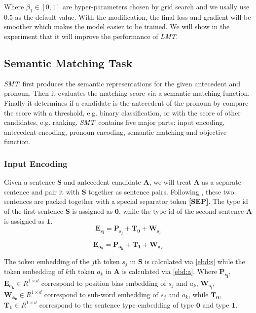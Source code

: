 \documentclass[11pt,a4paper]{article}
\newcommand{\lmt}{\textit{LMT}}
\newcommand{\smt}{\textit{SMT}}
\begin{document}
Where $\beta_1 \in [0,1]$ are hyper-parameters chosen by grid search and we usally use $0.5$ as the default value. With the modification, the final loss and gradient will be smoother which makes the model easier to be trained. We will show in the experiment that it will improve the performance of \lmt.

\subsection{Semantic Matching Task}
\label{sec:smt}






\smt~first produces the semantic representations for the given antecedent and pronoun. Then it evaluates the matching score via a semantic matching function. Finally it determines if a candidate is the antecedent of the pronoun by compare the score with a threshold, e.g. binary classification, or with the score of other candidates, e.g. ranking.
\smt~contains five major parts: input encoding, antecedent encoding, pronoun encoding, semantic matching and objective function.

\subsubsection{Input Encoding}
\label{sec:smt-input}
Given a sentence $\mathbf{S}$ and antecedent candidate $\mathbf{A}$, we will treat $\mathbf{A}$ as a separate sentence and pair it with $\mathbf{S}$ together as sentence pairs. Following \cite{devlin2018bert}, these two sentences are packed together with a special separator token \textbf{[SEP]}.  The type id of the first sentence $\mathbf{S}$ is assigned as $\mathbf{0}$, while the type id of the second sentence $\mathbf{A}$ is assigned as $\mathbf{1}$.
\begin{equation}
\label{ebd:s}
    \mathbf{E_{s_j}} = \mathbf{P_{s_j}} + \mathbf{T_0} + \mathbf{W_{s_j}}
\end{equation}

\begin{equation}
\label{ebd:a}
   \mathbf{E_{a_k}} = \mathbf{P_{a_k}} + \mathbf{T_1} + \mathbf{W_{a_k}}
\end{equation}

The token embedding of the $j$th token $s_j$ in $\mathbf{S}$ is calculated via  \eqref{ebd:s} while the token embedding of $k$th token $a_k$ in $\mathbf{A}$ is calculated via \eqref{ebd:a}. Where $\mathbf{P_{s_j}}$,$\mathbf{E_{a_k}} \in R^{1 \times d}$  correspond to position bias embedding of $s_j$ and $a_k$, $\mathbf{W_{s_j}}$,$\mathbf{W_{a_k}} \in R^{1 \times d}$ correspond to sub-word embedding of  $s_j$ and $a_k$, while $\mathbf{T_0}$, $\mathbf{T_1} \in R^{1 \times d}$ correspond to the sentence type embedding of type $\mathbf{0}$ and type $\mathbf{1}$.
\end{document}
